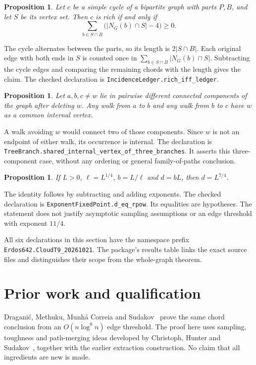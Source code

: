 \documentclass[11pt]{article}
\newtheorem{proposition}[theorem]{Proposition}
\begin{document}
\begin{proposition}
Let $c$ be a simple cycle of a bipartite graph with parts $P,B$, and let $S$ be its vertex set. Then $c$ is rich if and only if
\[
 \sum_{b\in S\cap B}\bigl(|N_G(b)\cap S|-4\bigr)\ge0.
\]
\end{proposition}
The cycle alternates between the parts, so its length is $2|S\cap B|$. Each original edge with both ends in $S$ is counted once in $\sum_{b\in S\cap B}|N_G(b)\cap S|$. Subtracting the cycle edges and comparing the remaining chords with the length gives the claim. The checked declaration is \nolinkurl{IncidenceLedger.rich_iff_ledger}.

\begin{proposition}
Let $a,b,c\ne w$ lie in pairwise different connected components of the graph after deleting $w$. Any walk from $a$ to $b$ and any walk from $b$ to $c$ have $w$ as a common internal vertex.
\end{proposition}
A walk avoiding $w$ would connect two of those components. Since $w$ is not an endpoint of either walk, its occurrence is internal. The declaration is \nolinkurl{TreeBranch.shared_internal_vertex_of_three_branches}. It asserts this three-component case, without any ordering or general family-of-paths conclusion.

\begin{proposition}
If $L>0$, $\ell=L^{1/4}$, $b=L/\ell$ and $d=bL$, then $d=L^{7/4}$.
\end{proposition}
The identity follows by subtracting and adding exponents. The checked declaration is \nolinkurl{ExponentFixedPoint.d_eq_rpow}. Its equalities are hypotheses. The statement does not justify asymptotic sampling assumptions or an edge threshold with exponent $11/4$.

All six declarations in this section have the namespace prefix \nolinkurl{Erdos642.CloudT9_20261021}. The package's results table links the exact source files and distinguishes their scope from the whole-graph theorem.

\section{Prior work and qualification}
Dragani\'c, Methuku, Munh\'a Correia and Sudakov~\cite{dmms} prove the same chord conclusion from an $O(n\log^8 n)$ edge threshold. The proof here uses sampling, toughness and path-merging ideas developed by Christoph, Hunter and Sudakov~\cite{chs}, together with the earlier extraction construction. No claim that all ingredients are new is made.
\end{document}
